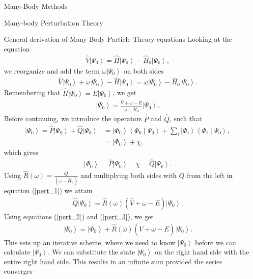 \documentclass[twoside,english]{uiofysmaster}
\begin{document}
\begin{chapter}{Many-Body Methods}
\begin{section}{Many-body Perturbation Theory}
	 	\begin{subsection}{General derivation of Many-Body Particle Theory equations}
	 		Looking at the equation
	 		\begin{align}
	 			\hat V \left| \Psi_0 \right> = \hat H \left| \Psi_0 \right> - \hat H_0 \left| \Psi_0 \right> ,
	 		\end{align}
	 		we reorganize and add the term $\omega \left| \Psi_0 \right>$ on both sides
	 		\begin{align}
	 			\hat V \left| \Psi_0 \right> + \omega \left| \Psi_0 \right> - \hat H \left| \Psi_0 \right> = \omega \left| \Psi_0 \right> - \hat H_0 \left| \Psi_0 \right> .
	 		\end{align}
	 		Remembering that $\hat H \left| \Psi_0 \right> = E\left| \Psi_0 \right> $, we get 
	 		\begin{align}
	 			\left| \Psi_0 \right> = \frac{ \hat V + \omega - E }{\omega - \hat H_0} \left| \Psi_0 \right>.
	 			\label{pert_1}
	 		\end{align}
	 		Before continuing, we introduce the operators $\hat P$ and $\hat Q$, such that
	 		\begin{align}
	 			\left| \Psi_0 \right> = \hat P \left| \Psi_0 \right> + \hat Q \left| \Psi_0 \right> 
	 			&= \left| \Phi_0 \right> \left< \Phi_0 \middle| \Psi_0 \right> + \sum_i \left| \Phi_i \right> \left< \Phi_i \middle| \Psi_0 \right> ,
	 			\label{pert_2} \\
	 			&= \left| \Phi_0 \right> + \chi ,
	 		\end{align}
	 		which gives
	 		\begin{align}
	 			\left| \Phi_0 \right> = \hat P \left| \Psi_0 \right> \;\;\;\; \chi = \hat Q \left| \Psi_0 \right> .
	 			\label{pert_3}
	 		\end{align}
	 		Using $\hat R(\omega) = \frac{\hat{Q}}{\left( \omega - \hat H_0 \right)}$ and multiplying both sides with $\hat Q$ from the left in equation (\ref{pert_1}) we attain
	 		\begin{align}
	 			\hat Q \left| \Psi_0 \right> = \hat R(\omega) \left( \hat V + \omega - E \right) \left| \Psi_0 \right>.
	 		\end{align}
	 		Using equations (\ref{pert_2}) and (\ref{pert_3}), we get
	 		\begin{align}
	 			\left| \Psi_0 \right> = \left| \Phi_0 \right> + \hat R(\omega) \left( \hat V + \omega - E \right) \left| \Psi_0 \right>.
	 		\end{align}
	 		This sets up an iterative scheme, where we need to know $\left| \Psi_0 \right>$ before we can calculate $\left| \Psi_0 \right>$. We can substitute the state $\left| \Psi_0 \right>$ on the right hand side with the entire right hand side. This results in an infinite sum provided the series converges

\end{subsection}
\end{section}
\end{chapter}
\end{document}

